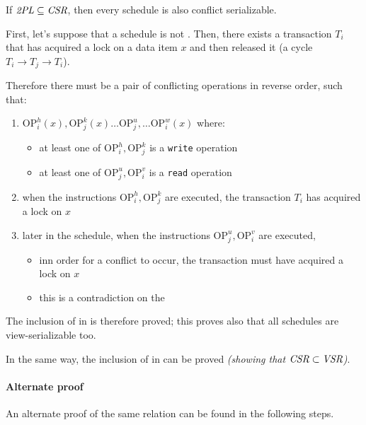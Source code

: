 \documentclass[english]{article}
\begin{document}
If \(\textit{2PL} \subseteq \textit{CSR}\), then every \TPL schedule is also conflict serializable.

\bigskip
First, let's suppose that a \TPL schedule is not \CSR.
Then, there exists a transaction \(T_i\) that has acquired a lock on a data item \(x\) and then released it (a cycle \(T_i \rightarrow T_j \rightarrow T_i\)).

Therefore there must be a pair of conflicting operations in reverse order, such that:

\begin{enumerate}
  \item \(\text{OP}_{i}^{h}(x), \text{OP}_{j}^{k}(x) \ldots \text{OP}_{j}^{u}, \ldots \text{OP}_{i}^{w}(x)\) where:
        \begin{itemize}
          \item at least one of \(\text{OP}_{i}^{h}, \text{OP}_{j}^{k}\) is a \texttt{write} operation
          \item at least one of \(\text{OP}_{j}^{u}, \text{OP}_{i}^{v}\) is a \texttt{read} operation
        \end{itemize}
  \item when the instructions \(\text{OP}_{i}^{h}, \text{OP}_{j}^{k}\) are executed, the transaction \(T_i\) has acquired a lock on \(x\)
  \item later in the schedule, when the instructions \(\text{OP}_{j}^{u}, \text{OP}_{i}^{v}\) are executed,
        \begin{itemize}
          \item inn order for a conflict to occur, the transaction must have acquired a lock on \(x\)
          \item this is a contradiction on the \TPL
        \end{itemize}
\end{enumerate}

The inclusion of \TPL in \CSR is therefore proved;
this proves also that all \TPL schedules are view-serializable too.

In the same way, the inclusion of \TPL in \VSR can be proved \textit{(showing that \(\textit{CSR} \subset \textit{VSR}\))}.

\paragraph{Alternate proof}

An alternate proof of the same relation can be found in the following steps.
\end{document}
